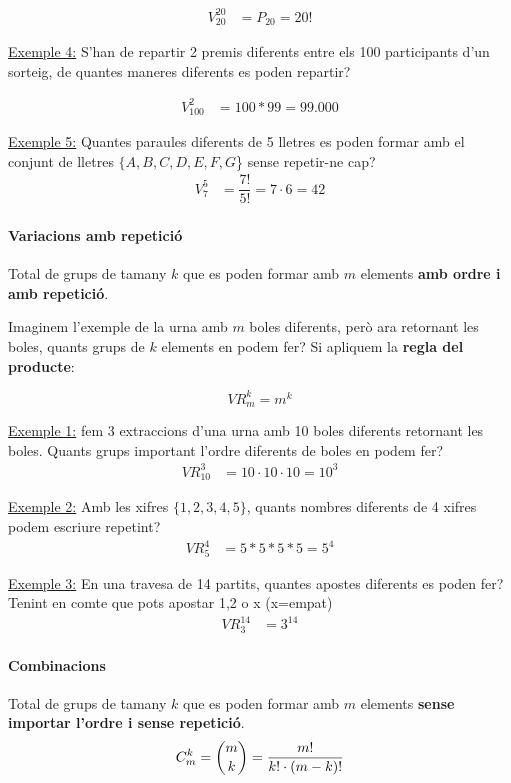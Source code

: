 \documentclass{article}
\begin{document}
\begin{align*}
V_{20}^{20} & = P_{20} = 20!
\end{align*}

\underline{Exemple 4:} S'han de repartir 2 premis diferents entre els 100 participants d'un sorteig, de quantes maneres diferents es poden repartir?

\begin{align*}
V_{100}^{2} & = 100 * 99 = 99.000
\end{align*}

\underline{Exemple 5:} Quantes paraules diferents de 5 lletres es poden formar amb el conjunt de lletres $\{A, B, C, D, E, F, G$\} sense repetir-ne cap?
\begin{align*}
V_{7}^{5} & = \dfrac{7!}{5!} = 7 \cdot 6 = 42
\end{align*}

\paragraph{Variacions amb repetició}
Total de grups de tamany $k$ que es poden formar amb $m$ elements \textbf{amb ordre i amb repetició}.

Imaginem l'exemple de la urna amb $m$ boles diferents, però ara retornant les boles, quants grups de $k$ elements en podem fer? Si apliquem la \textbf{regla del producte}:

\begin{equation*}
VR_m^{k} = m^k
\end{equation*}

\underline{Exemple 1:} fem 3 extraccions d'una urna amb 10 boles diferents retornant les boles. Quants grups important l'ordre diferents de boles en podem fer?
\begin{align*}
VR_{10}^{3} & = 10 \cdot 10 \cdot 10 = 10^3
\end{align*}

\underline{Exemple 2:} Amb les xifres $\{1, 2, 3, 4, 5\}$, quants nombres diferents de 4 xifres podem
escriure repetint?
\begin{align*}
VR_{5}^{4} & = 5 * 5 * 5 * 5 = 5^4
\end{align*}

\underline{Exemple 3:} En una travesa de 14 partits, quantes apostes diferents es poden fer? Tenint en comte que pots apostar 1,2 o x (x=empat)
\begin{align*}
VR_{3}^{14} & = 3^{14}
\end{align*}


\paragraph{Combinacions}
Total de grups de tamany $k$ que es poden formar amb $m$ elements \textbf{sense importar l'ordre i sense repetició}.
\begin{equation*}
C_{m}^{k} = \dbinom{m}{k}= \dfrac{m!}{k! \cdot (m-k)!}
\end{equation*}
\end{document}
